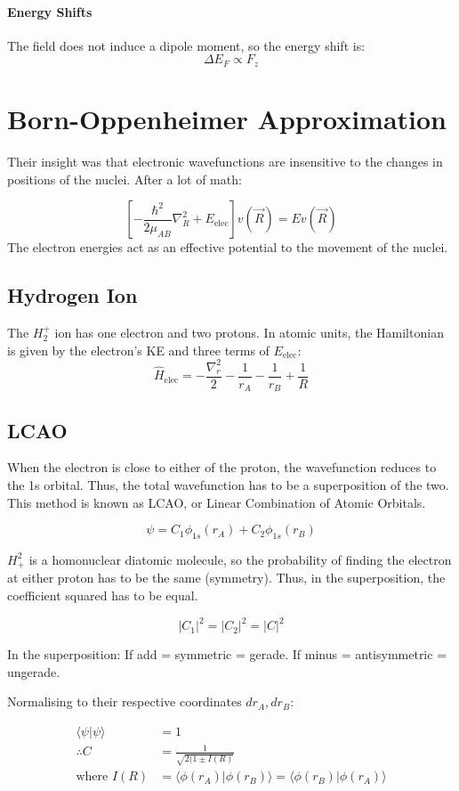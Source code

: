 \documentclass[12pt]{article}
\begin{document}
\paragraph{Energy Shifts}
The field does not induce a dipole moment, so the energy shift is:
\[ \Delta E_F \propto F_z\]

\section{Born-Oppenheimer Approximation}

Their insight was that electronic wavefunctions are insensitive to the changes in positions of the nuclei. After a lot of math:

\[\left[-\frac{\hbar^2}{2\mu_{AB}}\nabla^2_R + E_{\text{elec}}\right]v(\vec{R}) = Ev(\vec{R})\]
The electron energies act as an effective potential to the movement of the nuclei.

\subsection{Hydrogen Ion}
The $H_2^+$ ion has one electron and two protons. In atomic units, the Hamiltonian is given by the electron's KE and three terms of $E_{\text{elec}}$:
\[\hat{H}_{\text{elec}} = -\frac{\nabla_r^2}{2}-\frac{1}{r_A}-\frac{1}{r_B}+\frac{1}{R}\]

\subsection{LCAO}
When the electron is close to either of the proton, the wavefunction reduces to the 1s orbital. Thus, the total wavefunction has to be a superposition of the two. This method is known as LCAO, or Linear Combination of Atomic Orbitals.

\[\psi = C_1\phi_{1s}(r_A) + C_2\phi_{1s}(r_B) \]

$H^2_+$ is a homonuclear diatomic molecule, so the probability of finding the electron at either proton has to be the same (symmetry). Thus, in the superposition, the coefficient squared has to be equal. 

\[|C_1|^2 = |C_2|^2 = |C|^2\]

In the superposition: If add = symmetric = gerade. If minus = antisymmetric = ungerade.

Normalising to their respective coordinates $dr_A, dr_B$:

\begin{align*}
    \langle \psi | \psi \rangle &= 1\\
    \therefore C &= \frac{1}{\sqrt{2(1\pm I(R)}}\\
    \text{where } I(R) &= \langle \phi(r_A)|\phi(r_B)\rangle = \langle \phi(r_B)|\phi(r_A)\rangle  
\end{align*}
\end{document}
